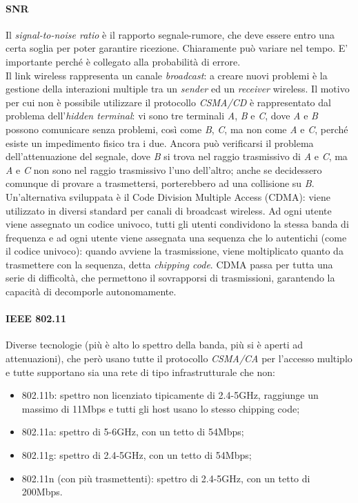 \paragraph{SNR}
Il \textit{signal-to-noise ratio} è il rapporto segnale-rumore, che deve essere entro una certa soglia per poter garantire ricezione. Chiaramente può variare nel tempo. E' importante perché è collegato alla probabilità di errore. \\

Il link wireless rappresenta un canale \textit{broadcast}: a creare nuovi problemi è la gestione della interazioni multiple tra un \textit{sender} ed un \textit{receiver} wireless. Il motivo per cui non è possibile utilizzare il protocollo \textit{CSMA/CD} è rappresentato dal problema dell'\textit{hidden terminal}: vi sono tre terminali \textit{A}, \textit{B} e \textit{C}, dove \textit{A} e \textit{B} possono comunicare senza problemi, così come \textit{B}, \textit{C}, ma non come \textit{A} e \textit{C}, perché esiste un impedimento fisico tra i due. Ancora può verificarsi il problema dell'attenuazione del segnale, dove \textit{B} si trova nel raggio trasmissivo di \textit{A} e \textit{C}, ma \textit{A} e \textit{C} non sono nel raggio trasmissivo l'uno dell'altro; anche se decidessero comunque di provare a trasmettersi, porterebbero ad una collisione su \textit{B}. \\
Un'alternativa sviluppata è il Code Division Multiple Access (CDMA): viene utilizzato in diversi standard per canali di broadcast wireless. Ad ogni utente viene assegnato un codice univoco, tutti gli utenti condividono la stessa banda di frequenza e ad ogni utente viene assegnata una sequenza che lo autentichi (come il codice univoco): quando avviene la trasmissione, viene moltiplicato quanto da trasmettere con la sequenza, detta \textit{chipping code}. CDMA passa per tutta una serie di difficoltà, che permettono il sovrapporsi di trasmissioni, garantendo la capacità di decomporle autonomamente.

\paragraph{IEEE 802.11}
Diverse tecnologie (più è alto lo spettro della banda, più si è aperti ad attenuazioni), che però usano tutte il protocollo \textit{CSMA/CA} per l'accesso multiplo e tutte supportano sia una rete di tipo infrastrutturale che non:
\begin{itemize}
	\item 802.11b: spettro non licenziato tipicamente di 2.4-5GHz, raggiunge un massimo di 11Mbps e tutti gli host usano lo stesso chipping code;
	\item 802.11a: spettro di 5-6GHz, con un tetto di 54Mbps;
	\item 802.11g: spettro di 2.4-5GHz, con un tetto di 54Mbps;
	\item 802.11n (con più trasmettenti): spettro di 2.4-5GHz, con un tetto di 200Mbps.
\end{itemize}

